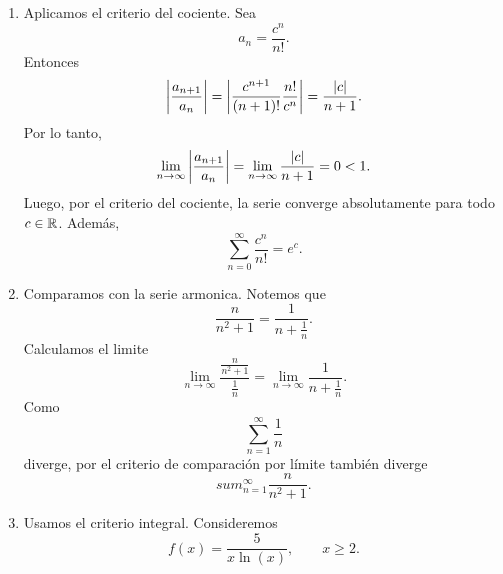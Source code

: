 \documentclass[12pt,a4paper]{article}
\begin{document}
    \begin{solucion}
        \begin{enumerate}
            \item[(a)] Aplicamos el criterio del cociente. Sea
            \begin{equation*}
                a_{n}=\frac{c^{n}}{n!}.
            \end{equation*}
            Entonces
            \begin{equation*}
                \abs{\frac{a_{n+1}}{a_{n}}}=\abs{\frac{c^{n+1}}{(n+1)!}\frac{n!}{c^{n}}}=\frac{\abs{c}}{n+1}.
            \end{equation*}
            Por lo tanto,
            \begin{equation*}
                \lim_{n\to\infty}\abs{\frac{a_{n+1}}{a_{n}}}=\lim_{n\to\infty}\frac{\abs{c}}{n+1}=0<1.
            \end{equation*}
            Luego, por el criterio del cociente, la serie converge absolutamente para todo $c\in\mathbb{R}$. Además,
            \begin{equation*}
                \sum_{n=0}^{\infty}\frac{c^{n}}{n!}=e^{c}.
            \end{equation*}
            \item[(b)] Comparamos con la serie armonica. Notemos que
            \begin{equation*}
                \frac{n}{n^{2}+1}=\frac{1}{n+\frac{1}{n}}.
            \end{equation*}
            Calculamos el limite
            \begin{equation*}
                \lim_{n\to\infty}\frac{\frac{n}{n^{2}+1}}{\frac{1}{n}}=\lim_{n\to\infty}\frac{1}{n+\frac{1}{n}}.
            \end{equation*}
            Como
            \begin{equation*}
                \sum_{n=1}^{\infty}\frac{1}{n}
            \end{equation*}
            diverge, por el criterio de comparación por límite también diverge
            \begin{equation*}
                sum_{n=1}^{\infty}\frac{n}{n^{2}+1}.
            \end{equation*}
            \item[(c)] Usamos el criterio integral. Consideremos
            \begin{equation*}
                f(x)=\frac{5}{x\ln(x)},\qquad x\geq2.
            \end{equation*}

\end{enumerate}
\end{solucion}
\end{document}

